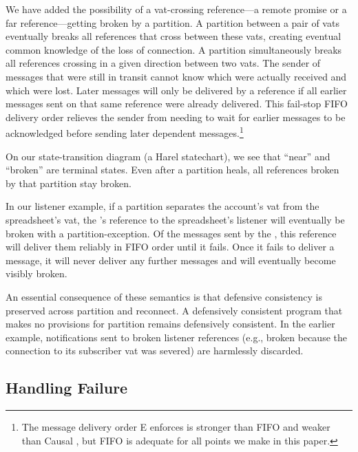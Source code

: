 \documentclass{llncs}
\begin{document}
We have added the possibility of a vat-crossing reference---a remote
promise or a far reference---getting broken by a partition. A
partition between a pair of vats eventually breaks all references that
cross between these vats, creating eventual common knowledge of the
loss of connection. A partition simultaneously breaks all references
crossing in a given direction between two vats. The sender of messages
that were still in transit cannot know which were actually received and
which were lost. Later messages will only be delivered by a reference
if all earlier messages sent on that same reference were already
delivered. This fail-stop FIFO delivery order relieves the sender from
needing to wait for earlier messages to be acknowledged before sending
later dependent messages.\footnote{
%
The message delivery order E enforces is stronger than FIFO and weaker
than Causal \cite{tribble:channels}, but FIFO is adequate for all
points we make in this paper.}

On our state-transition diagram (a Harel statechart), we see that
``near'' and ``broken'' are terminal states. Even after a partition
heals, all references broken by that partition stay broken.

In our listener example, if a partition separates the account's vat
from the spreadsheet's vat, the 's reference to the
spreadsheet's listener will eventually be broken with a
partition-exception. Of the  messages sent by the
, this reference will deliver them reliably in FIFO
order until it fails. Once it fails to deliver a message, it will
never deliver any further messages and will eventually become
visibly broken.

An essential consequence of these semantics is that defensive
consistency is preserved across partition and reconnect.  A
defensively consistent program that makes no provisions for partition
remains defensively consistent. In the earlier 
example,  notifications sent to broken listener
references (e.g., broken because the connection to its subscriber vat was
severed) are harmlessly discarded.

\subsection{Handling Failure}
\end{document}
